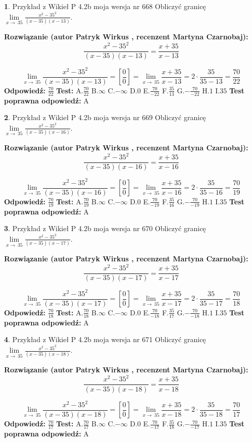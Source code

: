 \documentclass[12pt, a4paper]{article}
\theoremstyle{definition} %
\newtheorem{zad}{}
\newcommand{\zadStart}[1]{\begin{zad}#1\newline}
\newcommand{\zadStop}{\end{zad}}
\newcommand{\rozwStart}[2]{\noindent \textbf{Rozwiązanie (autor #1 , recenzent #2): }\newline}
\newcommand{\rozwStop}{\newline}
\newcommand{\odpStart}{\noindent \textbf{Odpowiedź:}\newline}
\newcommand{\odpStop}{\newline}
\newcommand{\testStart}{\noindent \textbf{Test:}\newline}
\newcommand{\testStop}{\newline}
\newcommand{\kluczStart}{\noindent \textbf{Test poprawna odpowiedź:}\newline}
\newcommand{\kluczStop}{\newline}
\begin{document}
\zadStart{Przykład z Wikieł P 4.2b moja wersja nr 668}
Obliczyć granicę $\lim\limits_{x\to\ 35}\frac{x^{2}-35^{2}}{(x-35)(x-13)}$.
\zadStop
\rozwStart{Patryk Wirkus}{Martyna Czarnobaj}
$$\frac{x^{2}-35^{2}}{(x-35)(x-13)}=\frac{x+35}{x-13}$$

$$\lim\limits_{x\to\ 35}\frac{x^{2}-35^{2}}{(x-35)(x-13)}=[\frac{0}{0}]=\lim\limits_{x\to\ 35}\frac{x+35}{x-13}=2 \cdot \frac{35}{35-13} = \frac{70}{22}$$
\rozwStop
\odpStart
$\frac{70}{22}$
\odpStop
\testStart
A.$\frac{70}{22}$
B.$\infty$
C.$-\infty$
D.$0$
E.$\frac{70}{-22}$
F.$\frac{35}{13}$
G.$-\frac{70}{-22}$
H.$1$
I.$35$
\testStop
\kluczStart
A
\kluczStop



\zadStart{Przykład z Wikieł P 4.2b moja wersja nr 669}
Obliczyć granicę $\lim\limits_{x\to\ 35}\frac{x^{2}-35^{2}}{(x-35)(x-16)}$.
\zadStop
\rozwStart{Patryk Wirkus}{Martyna Czarnobaj}
$$\frac{x^{2}-35^{2}}{(x-35)(x-16)}=\frac{x+35}{x-16}$$

$$\lim\limits_{x\to\ 35}\frac{x^{2}-35^{2}}{(x-35)(x-16)}=[\frac{0}{0}]=\lim\limits_{x\to\ 35}\frac{x+35}{x-16}=2 \cdot \frac{35}{35-16} = \frac{70}{19}$$
\rozwStop
\odpStart
$\frac{70}{19}$
\odpStop
\testStart
A.$\frac{70}{19}$
B.$\infty$
C.$-\infty$
D.$0$
E.$\frac{70}{-19}$
F.$\frac{35}{16}$
G.$-\frac{70}{-19}$
H.$1$
I.$35$
\testStop
\kluczStart
A
\kluczStop



\zadStart{Przykład z Wikieł P 4.2b moja wersja nr 670}
Obliczyć granicę $\lim\limits_{x\to\ 35}\frac{x^{2}-35^{2}}{(x-35)(x-17)}$.
\zadStop
\rozwStart{Patryk Wirkus}{Martyna Czarnobaj}
$$\frac{x^{2}-35^{2}}{(x-35)(x-17)}=\frac{x+35}{x-17}$$

$$\lim\limits_{x\to\ 35}\frac{x^{2}-35^{2}}{(x-35)(x-17)}=[\frac{0}{0}]=\lim\limits_{x\to\ 35}\frac{x+35}{x-17}=2 \cdot \frac{35}{35-17} = \frac{70}{18}$$
\rozwStop
\odpStart
$\frac{70}{18}$
\odpStop
\testStart
A.$\frac{70}{18}$
B.$\infty$
C.$-\infty$
D.$0$
E.$\frac{70}{-18}$
F.$\frac{35}{17}$
G.$-\frac{70}{-18}$
H.$1$
I.$35$
\testStop
\kluczStart
A
\kluczStop



\zadStart{Przykład z Wikieł P 4.2b moja wersja nr 671}
Obliczyć granicę $\lim\limits_{x\to\ 35}\frac{x^{2}-35^{2}}{(x-35)(x-18)}$.
\zadStop
\rozwStart{Patryk Wirkus}{Martyna Czarnobaj}
$$\frac{x^{2}-35^{2}}{(x-35)(x-18)}=\frac{x+35}{x-18}$$

$$\lim\limits_{x\to\ 35}\frac{x^{2}-35^{2}}{(x-35)(x-18)}=[\frac{0}{0}]=\lim\limits_{x\to\ 35}\frac{x+35}{x-18}=2 \cdot \frac{35}{35-18} = \frac{70}{17}$$
\rozwStop
\odpStart
$\frac{70}{17}$
\odpStop
\testStart
A.$\frac{70}{17}$
B.$\infty$
C.$-\infty$
D.$0$
E.$\frac{70}{-17}$
F.$\frac{35}{18}$
G.$-\frac{70}{-17}$
H.$1$
I.$35$
\testStop
\kluczStart
A
\kluczStop
\end{document}

